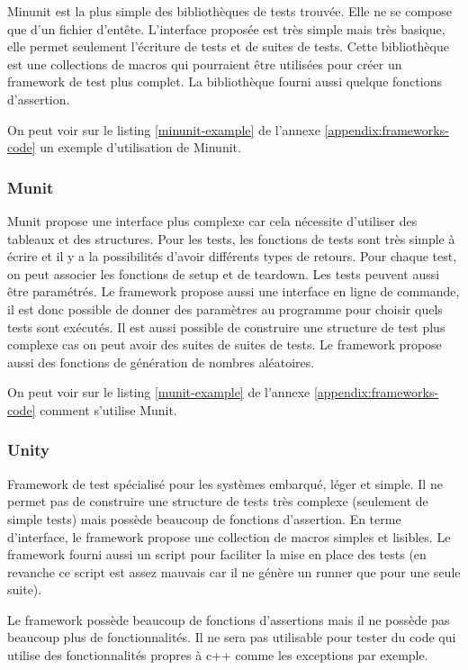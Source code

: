 \documentclass[a4paper]{article}
\begin{document}
Minunit est la plus simple des bibliothèques de tests trouvée. Elle ne se
compose que d'un fichier d'entête. L'interface proposée est très simple mais
très basique, elle permet seulement l'écriture de tests et de suites de tests.
Cette bibliothèque est une collections de macros qui pourraient être utilisées
pour créer un framework de test plus complet. La bibliothèque fourni aussi
quelque fonctions d'assertion.

On peut voir sur le listing \ref{minunit-example} de l'annexe
\ref{appendix:frameworks-code} un exemple d'utilisation de Minunit.

\subsubsection*{Munit}

Munit propose une interface plus complexe car cela nécessite d'utiliser des
tableaux et des structures. Pour les tests, les fonctions de tests sont très
simple à écrire et il y a la possibilités d'avoir différents types de retours.
Pour chaque test, on peut associer les fonctions de setup et de teardown. Les
tests peuvent aussi être paramétrés. Le framework propose aussi une interface en
ligne de commande, il est donc possible de donner des paramètres au programme
pour choisir quels tests sont exécutés. Il est aussi possible de construire une
structure de test plus complexe cas on peut avoir des suites de suites de tests.
Le framework propose aussi des fonctions de génération de nombres aléatoires.

On peut voir sur le listing \ref{munit-example} de l'annexe
\ref{appendix:frameworks-code} comment s'utilise Munit.

\subsubsection*{Unity}

Framework de test spécialisé pour les systèmes embarqué, léger et simple. Il ne
permet pas de construire une structure de tests très complexe (seulement de
simple tests) mais possède beaucoup de fonctions d'assertion. En terme
d'interface, le framework propose une collection de macros simples et lisibles.
Le framework fourni aussi un script pour faciliter la mise en place des tests
(en revanche ce script est assez mauvais car il ne génère un runner que pour une
seule suite).

Le framework possède beaucoup de fonctions d'assertions mais il ne possède pas
beaucoup plus de fonctionnalités. Il ne sera pas utilisable pour tester du code
qui utilise des fonctionnalités propres à c++ comme les exceptions par exemple.
\end{document}
